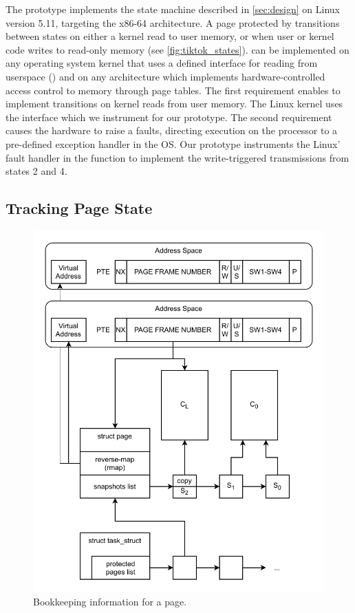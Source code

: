 \documentclass[letterpaper,twocolumn,10pt, anonymous]{article}
\begin{document}
The \tiktok prototype implements the state machine described in 
\autoref{sec:design} on Linux version 5.11, targeting the x86-64 
architecture. 
A page protected by \tiktok transitions between states on 
either a kernel read to user memory, or when user or kernel code
writes to read-only memory (see \autoref{fig:tiktok_states}).
\tiktok can be implemented on any operating system kernel that uses 
a defined interface for reading from userspace () and
on any architecture which implements hardware-controlled access 
control to memory through page tables. 
The first requirement enables \tiktok to implement transitions on 
kernel reads from user memory.
The Linux kernel uses the  interface which 
we instrument for our prototype.
The second requirement causes the hardware to raise a faults, 
directing execution on the processor to a pre-defined exception 
handler in the OS.
Our prototype instruments the Linux' fault handler in the function 
 to implement the write-triggered transmissions 
from states 2 and 4.


\subsection{Tracking Page State}

\begin{figure}[]
  \includegraphics[width=\linewidth]{img/book-keeping.pdf}
  \caption{Bookkeeping information for a page.}
  \label{fig:tiktok_bookeeping}
\end{figure}
\end{document}
